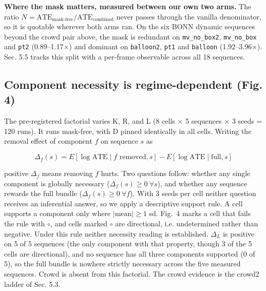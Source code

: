 \textbf{Where the mask matters, measured between our own two arms.} The ratio $N = \text{ATE}_{\text{mask-free}} / \text{ATE}_{\text{combined}}$ never passes through the vanilla denominator, so it is quotable wherever both arms ran. On the six BONN dynamic sequences beyond the crowd pair above, the mask is redundant on \texttt{mv\_no\_box2}, \texttt{mv\_no\_box} and \texttt{pt2} (0.89--1.17$\times$) and dominant on \texttt{balloon2}, \texttt{pt1} and \texttt{balloon} (1.92--3.96$\times$). Sec. 5.5 tracks this split with a per-frame observable across all 18 sequences.


\subsection{Component necessity is regime-dependent (Fig. 4)}


The pre-registered factorial varies K, R, and L (8 cells $\times$ 5 sequences $\times$ 3 seeds = 120 runs). It runs mask-free, with D pinned identically in all cells. Writing the removal effect of component $f$ on sequence $s$ as


\begin{equation}
\Delta_f(s) = E[\log \text{ATE} \mid f \text{ removed}, s] - E[\log \text{ATE} \mid \text{full}, s]
\end{equation}


positive $\Delta_f$ means removing $f$ hurts. Two questions follow: whether any single component is globally necessary ($\Delta_f(s) \ge 0\ \forall s$), and whether any sequence rewards the full bundle ($\Delta_f(s) \ge 0\ \forall f$). With 3 seeds per cell neither question receives an inferential answer, so we apply a descriptive support rule. A cell supports a component only where $|\text{mean}| \ge 1$ sd. Fig.~4 marks a cell that fails the rule with $\circ$, and cells marked $\circ$ are directional, i.e. undetermined rather than negative. Under this rule neither necessity reading is established. $\Delta_L$ is positive on 5 of 5 sequences (the only component with that property, though 3 of the 5 cells are directional), and no sequence has all three components supported (0 of 5), so the full bundle is nowhere strictly necessary across the five measured sequences. Crowd is absent from this factorial. The crowd evidence is the crowd2 ladder of Sec. 5.3.


